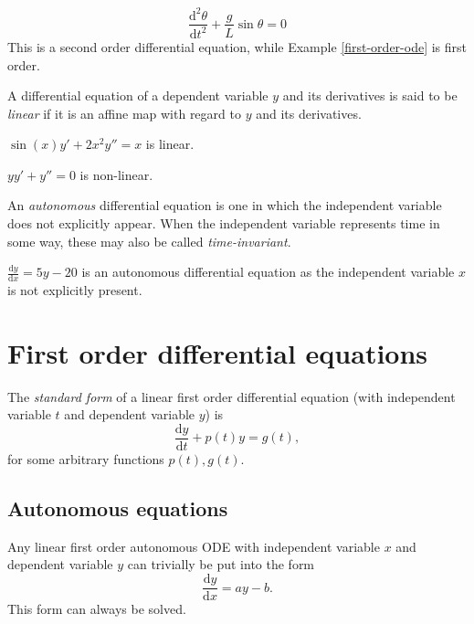 \documentclass[12pt]{article}
\begin{document}
\begin{exmp}
    \[\frac{\mathrm{d}^2\theta}{\mathrm{d}t^2} + \frac{g}{L}\sin\theta = 0\]
    This is a second order differential equation, while Example \ref{first-order-ode} is first order.
\end{exmp}

\begin{defn}
    A differential equation of a dependent variable $y$ and its derivatives is said to be \emph{linear} if it is an affine map with regard to $y$ and its derivatives.
\end{defn}

\begin{exmp}
    $\sin(x)y' + 2x^2y'' = x$ is linear.
\end{exmp}

\begin{exmp}
    $yy' + y'' = 0$ is non-linear.
\end{exmp}

\begin{defn}
    An \emph{autonomous} differential equation is one in which the independent variable does not explicitly appear. When the independent variable represents time in some way, these may also be called \emph{time-invariant}.
\end{defn}

\begin{exmp}
    $\frac{\mathrm{d}y}{\mathrm{d}x} = 5y - 20$ is an autonomous differential equation as the independent variable $x$ is not explicitly present.
\end{exmp}

\section{First order differential equations}

\begin{defn}
    The \emph{standard form} of a linear first order differential equation (with independent variable $t$ and dependent variable $y$) is \[\frac{\mathrm{d}y}{\mathrm{d}t} + p(t)y = g(t),\] for some arbitrary functions $p(t), g(t)$.
\end{defn}

\subsection{Autonomous equations}

Any linear first order autonomous ODE with independent variable $x$ and dependent variable $y$ can trivially be put into the form \[\frac{\mathrm{d}y}{\mathrm{d}x} = ay - b.\] This form can always be solved.
\end{document}
